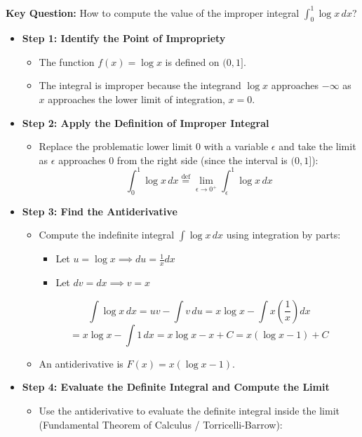 \begin{cascade}
	\textbf{Key Question:} How to compute the value of the improper integral $\int_0^1 \log x \, dx$?
	\begin{itemize}
		\item \textbf{Step 1: Identify the Point of Impropriety}
		      \begin{itemize}
			      \item The function $f(x) = \log x$ is defined on $(0, 1]$.
			      \item The integral is improper because the integrand $\log x$ approaches $-\infty$ as $x$ approaches the lower limit of integration, $x=0$.
		      \end{itemize}
		\item \textbf{Step 2: Apply the Definition of Improper Integral}
		      \begin{itemize}
			      \item Replace the problematic lower limit $0$ with a variable $\epsilon$ and take the limit as $\epsilon$ approaches $0$ from the right side (since the interval is $(0, 1]$):
			            \[ \int_0^1 \log x \, dx \overset{\text{def}}{=} \lim_{\epsilon \to 0^+} \int_\epsilon^1 \log x \, dx \]
		      \end{itemize}
		\item \textbf{Step 3: Find the Antiderivative}
		      \begin{itemize}
			      \item Compute the indefinite integral $\int \log x \, dx$ using integration by parts:
			            \begin{itemize}
				            \item Let $u = \log x \implies du = \frac{1}{x} dx$
				            \item Let $dv = dx \implies v = x$
			            \end{itemize}
			            \[ \int \log x \, dx = uv - \int v \, du = x \log x - \int x \left(\frac{1}{x}\right) dx \]
			            \[ = x \log x - \int 1 \, dx = x \log x - x + C = x(\log x - 1) + C \]
			      \item An antiderivative is $F(x) = x(\log x - 1)$.
		      \end{itemize}
		\item \textbf{Step 4: Evaluate the Definite Integral and Compute the Limit}
		      \begin{itemize}
			      \item Use the antiderivative to evaluate the definite integral inside the limit (Fundamental Theorem of Calculus / Torricelli-Barrow):

\end{itemize}
\end{itemize}
\end{cascade}
